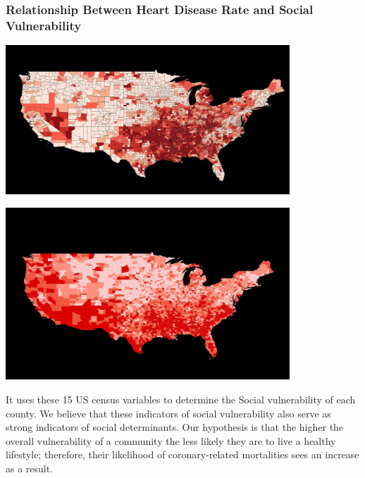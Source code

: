 \documentclass[journal,12pt,onecolumn]{IEEEtran}
\begin{document}
\subsubsection{Relationship Between Heart Disease Rate and Social Vulnerability}
\begin{center}
\centering
\includegraphics[width=0.8\textwidth]{figures/chloro_heart.PNG}
\label{fig:chloroheart}
\end{center}

\begin{center}
\centering
\includegraphics[width=0.8\textwidth]{figures/chloro_svi.PNG}
\label{fig:chlorosvi}
\end{center}

It uses these 15 US census variables to determine the Social vulnerability of each county. 
We believe that these indicators of social vulnerability also serve as strong indicators of social determinants. 
Our hypothesis is that the higher the overall vulnerability of a community the less likely they are to live a healthy lifestyle; therefore, their likelihood of coronary-related mortalities sees an increase as a result. 
\end{document}
